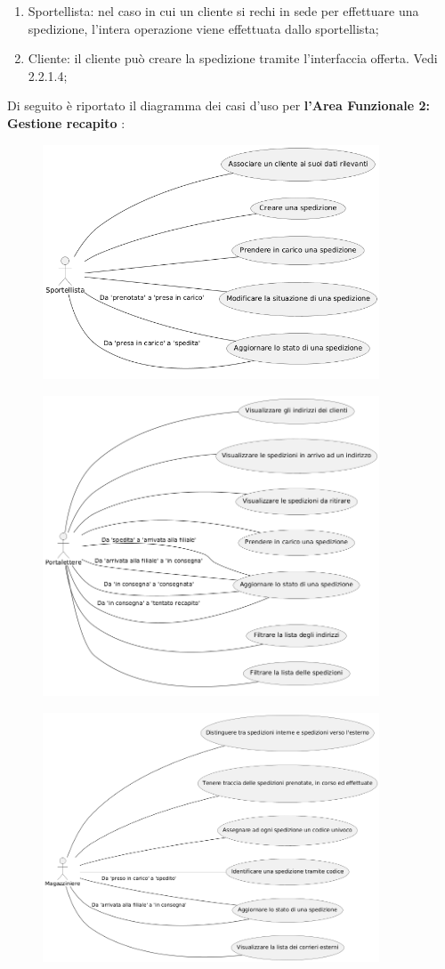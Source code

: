 \documentclass[a4paper,12pt]{article}
\begin{document}
\begin{enumerate}
  \item{Sportellista}: nel caso in cui un cliente si rechi in sede per effettuare una spedizione, l'intera operazione viene effettuata dallo sportellista;
  \item{Cliente}: il cliente può creare la spedizione tramite l'interfaccia offerta. Vedi 2.2.1.4;

\end{enumerate}
Di seguito è riportato il diagramma dei casi d'uso per \textbf{l'Area Funzionale 2: Gestione recapito} :
\begin{figure}[H]
  \centering
  \includegraphics[width=10cm]{assets/usecase_recapito_1.png}
\end{figure}
\begin{figure}[H]
  \centering
  \includegraphics[width=10cm]{assets/usecase_recapito_2.png}
\end{figure}
\begin{figure}[H]
  \centering
  \includegraphics[width=10cm]{assets/usecase_recapito_3.png}
\end{figure}
\end{document}
